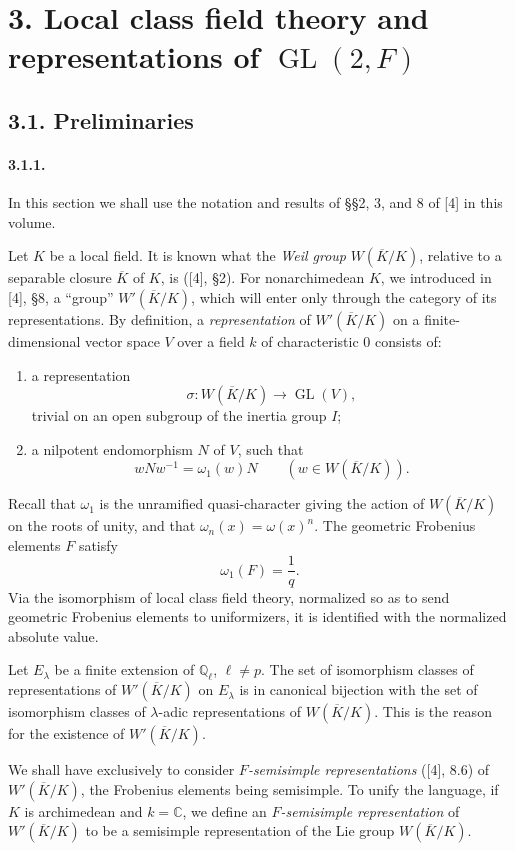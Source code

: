 \documentclass[10pt,a4paper]{article}
\providecommand{\GL}{\operatorname{GL}}
\providecommand{\Q}{\mathbb Q}
\providecommand{\C}{\mathbb C}
\begin{document}
\section*{3. Local class field theory and representations of \(\GL(2,F)\)}

\subsection*{3.1. Preliminaries}

\paragraph{3.1.1.} In this section we shall use the notation and results of §§2, 3, and 8 of [4] in this volume.

Let \(K\) be a local field. It is known what the \emph{Weil group} \(W(\overline K/K)\), relative to a separable closure \(\overline K\) of \(K\), is ([4], §2). For nonarchimedean \(K\), we introduced in [4], §8, a ``group'' \(W'(\overline K/K)\), which will enter only through the category of its representations. By definition, a \emph{representation} of \(W'(\overline K/K)\) on a finite-dimensional vector space \(V\) over a field \(k\) of characteristic \(0\) consists of:
\begin{enumerate}[label=(\alph*)]
\item a representation
\[
\sigma:W(\overline K/K)\longrightarrow\GL(V),
\]
trivial on an open subgroup of the inertia group \(I\);
\item a nilpotent endomorphism \(N\) of \(V\), such that
\[
wNw^{-1}=\omega_1(w)N\qquad(w\in W(\overline K/K)).
\]
\end{enumerate}
Recall that \(\omega_1\) is the unramified quasi-character giving the action of \(W(\overline K/K)\) on the roots of unity, and that \(\omega_n(x)=\omega(x)^n\). The geometric Frobenius elements \(F\) satisfy
\[
\omega_1(F)=\frac1q.
\]
Via the isomorphism of local class field theory, normalized so as to send geometric Frobenius elements to uniformizers, it is identified with the normalized absolute value.

Let \(E_\lambda\) be a finite extension of \(\Q_\ell\), \(\ell\ne p\). The set of isomorphism classes of representations of \(W'(\overline K/K)\) on \(E_\lambda\) is in canonical bijection with the set of isomorphism classes of \(\lambda\)-adic representations of \(W(\overline K/K)\). This is the reason for the existence of \(W'(\overline K/K)\).

\clearpage
{}
\hypertarget{authority-39}{}
We shall have exclusively to consider \emph{\(F\)-semisimple representations} ([4], 8.6) of \(W'(\overline K/K)\), the Frobenius elements being semisimple. To unify the language, if \(K\) is archimedean and \(k=\C\), we define an \emph{\(F\)-semisimple representation} of \(W'(\overline K/K)\) to be a semisimple representation of the Lie group \(W(\overline K/K)\).
\end{document}
